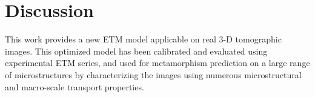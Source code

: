 \documentclass[draft,ms]{agujournal2019}
\begin{document}
\section{Discussion}
\label{sec:disc}

This work provides a new ETM model applicable on real 3-D tomographic images. This optimized model has been calibrated and evaluated using experimental ETM series, and used for metamorphism prediction on a large range of microstructures by characterizing the images using numerous microstructural and macro-scale transport properties.

\end{document}
